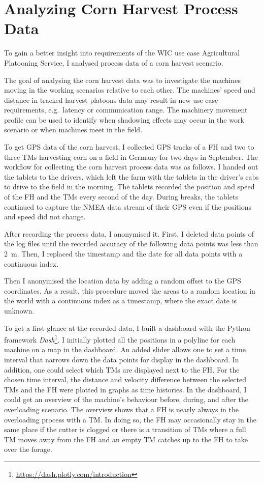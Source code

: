 \chapter{Analyzing Corn Harvest Process Data}
\label{chap:cornHarvestData}
To gain a better insight into requirements of the \ac{WIC} use case Agricultural Platooning Service, I analysed process data of a corn harvest scenario.

The goal of analysing the corn harvest data was to investigate the machines moving in the working scenarios relative to each other.
The machines' speed and distance in tracked harvest platoons data may result in new use case requirements,
e.g.\ latency or communication range.
The machinery movement profile can be used to identify when shadowing effects may occur in the work scenario or
when machines meet in the field.

To get GPS data of the corn harvest,
I collected GPS tracks of a \ac{FH} and two to three \ac{TM}s harvesting corn on a field in Germany for two days in September.
The workflow for collecting the corn harvest process data was as follows.
I handed out the tablets to the drivers, which left the farm with the tablets in the driver's cabs to drive to
the field in the morning.
The tablets recorded the position and speed of the \ac{FH} and the \ac{TM}s every second of the day.
During breaks, the tablets continued to capture the NMEA data stream of their GPS even if the positions and speed did not change.

After recording the process data, I anonymised it.
First, I deleted data points of the log files until the recorded accuracy of the following data points was less than
\SI{2}{\metre}.
Then, I replaced the timestamp and the date for all data points with a continuous index.

Then I anonymised the location data by adding a random offset to the GPS coordinates.
As a result, this procedure moved the areas to a random location in the world with a continuous index as a timestamp,
where the exact date is unknown.

To get a first glance at the recorded data, I built a dashboard with the Python framework \textit{Dash}\footnote{\url{https://dash.plotly.com/introduction}}.
I initially plotted all the positions in a polyline for each machine
on a map in the dashboard.
An added slider allows one to set a time interval that narrows down the data points for
display in the dashboard.
In addition, one could select which \ac{TM}s are displayed next to the \ac{FH}.
For the chosen time interval, the distance and velocity difference between the selected \ac{TM}s and the \ac{FH} were
plotted in graphs as time histories.
In the dashboard, I could get an overview of the machine's behaviour
before, during, and after the overloading scenario.
The overview shows that a \ac{FH} is nearly always in the overloading process with a \ac{TM}.
In doing so, the \ac{FH} may occasionally stay in the same place if the cutter is clogged or there is a
transition of \ac{TM}s where a full \ac{TM} moves away from the \ac{FH} and an empty \ac{TM} catches up to the
\ac{FH} to take over the forage.

